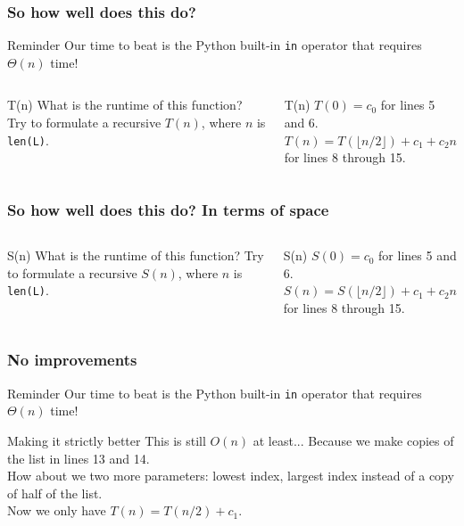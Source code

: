 \begin{frame}
	\frametitle{So how well does this do?}

		\begin{block}{Reminder}
			Our time to beat is the Python built-in \texttt{in} operator that requires $\Theta(n)$ time!
		\end{block}	
		\begin{columns}
					
			\pause
			\begin{questionblock}{T(n)}
				What is the runtime of this function? 
				Try to formulate a recursive $T(n)$, where $n$ is \texttt{len(L)}.
			\end{questionblock}	
			\pause
			\begin{answerblock}{T(n)}
				$T(0) = c_0$ for lines 5 and 6.\\
				$T(n) = T(\lfloor n/2 \rfloor) + c_1 + c_2n$ for lines 8 through 15.
			\end{answerblock}
		\end{columns}
\end{frame}

\begin{frame}
	\frametitle{So how well does this do? In terms of space}

		\begin{columns}
			\column{0.605\textwidth}
				
			\column{0.405\textwidth}
			\begin{questionblock}{S(n)}
				What is the runtime of this function? 
				Try to formulate a recursive $S(n)$, where $n$ is \texttt{len(L)}.
			\end{questionblock}	
			\pause
			\begin{answerblock}{S(n)}
				$S(0) = c_0$ for lines 5 and 6.\\
				$S(n) = S(\lfloor n/2 \rfloor) + c_1 + c_2n$ for lines 8 through 15.
			\end{answerblock}
		\end{columns}
\end{frame}

\begin{frame}
	\frametitle{No improvements}
		\begin{block}{Reminder}
			Our time to beat is the Python built-in \texttt{in} operator that requires $\Theta(n)$ time!
		\end{block}	
		\begin{exampleblock}{Making it strictly better}
			This is still $O(n)$ at least... Because we make copies of the list in lines 13 and 14.	\\
			How about we two more parameters: lowest index, largest index instead of a copy of half of the list.\\
			Now we only have $T(n) = T(n/2) + c_1$.
		\end{exampleblock}	
\end{frame}

